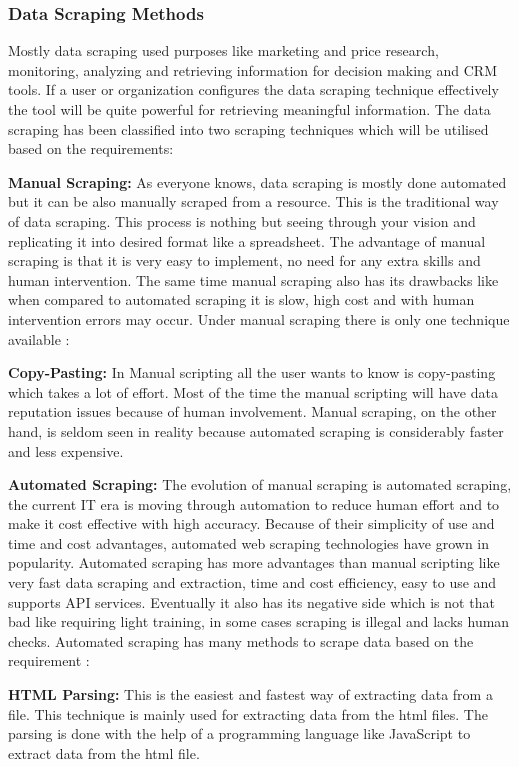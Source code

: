 %
%
\subsubsection{Data Scraping Methods}
Mostly data scraping used purposes like marketing and price research, monitoring, analyzing and retrieving information for decision making and CRM tools. If a user or organization configures the data scraping technique effectively the tool will be quite powerful for retrieving meaningful information. The data scraping has been classified into two scraping techniques which will be utilised based on the requirements:

{\bf Manual Scraping:} As everyone knows, data scraping is mostly done automated but it can be also manually scraped from a resource. This is the traditional way of data scraping. This process is nothing but seeing through your vision and replicating it into desired format like a spreadsheet. The advantage of manual scraping is that it is very easy to implement, no need for any extra skills and human intervention. The same time manual scraping also has its drawbacks like when compared to automated scraping it is slow, high cost and with human intervention errors may occur. Under manual scraping there is only one technique available \cite{Radware}:

	\textbf{Copy-Pasting:} In Manual scripting all the user wants to know is copy-pasting which takes a lot of effort. Most of the time the manual scripting will have data reputation issues because of human involvement. Manual scraping, on the other hand, is seldom seen in reality because automated scraping is considerably faster and less expensive.


{\bf Automated  Scraping:} The evolution of manual scraping is automated scraping, the current IT era is moving through automation to reduce human effort  and to make it cost effective with high accuracy. Because of their simplicity of use and time and cost advantages, automated web scraping technologies have grown in popularity. Automated scraping has more advantages than manual scripting like very fast data scraping and extraction, time and cost efficiency, easy to use and supports API services. Eventually it also has its negative side which is not that bad like requiring light training, in some cases scraping is illegal and lacks human checks. Automated scraping has many methods to scrape data based on the requirement \cite{Radware}:

\textbf{HTML Parsing:} This is the easiest and fastest way of extracting data from a file. This technique is mainly used for extracting data from the html files. The parsing is done with the help of a programming language like JavaScript to extract data from the html file. 
	
